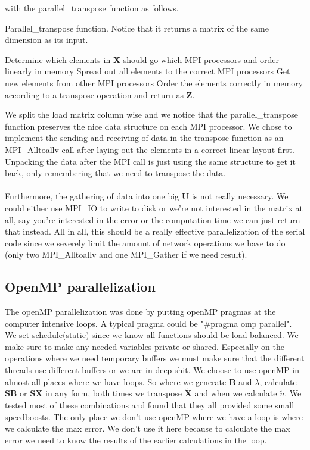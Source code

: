 \noindent with the parallel\_transpose function as follows.\\
\begin{algorithm}[H]
 \caption{Parallel\_transpose function. Notice that it returns a matrix of the same dimension as its input.}
 Determine which elements in $\mathbf{X}$ should go which MPI processors and order linearly in memory \;
 Spread out all elements to the correct MPI processors \;
 Get new elements from other MPI processors \;
 Order the elements correctly in memory according to a transpose operation and return as $\mathbf{Z}$.
 \label{code:transpose}
\end{algorithm}
\noindent We split the load matrix column wise and we notice that the parallel\_transpose function preserves the nice data structure on each MPI processor. We chose to implement the sending and receiving of data in the transpose function as an MPI\_Alltoallv call after laying out the elements in a correct linear layout first. Unpacking the data after the MPI call is just using the same structure to get it back, only remembering that we need to transpose the data.
\\ \\
Furthermore, the gathering of data into one big $\mathbf{U}$ is not really necessary. We could either use MPI\_IO to write to disk or we're not interested in the matrix at all, say you're interested in the error or the computation time we can just return that instead. All in all, this should be a really effective parallelization of the serial code since we severely limit the amount of network operations we have to do (only two MPI\_Alltoallv and one MPI\_Gather if we need result).
\subsection*{OpenMP parallelization}
The openMP parallelization was done by putting openMP pragmas at the computer intensive loops. A typical pragma could be "\#pragma omp parallel". We set schedule(static) since we know all functions should be load balanced. We make sure to make any needed variables private or shared. Especially on the operations where we need temporary buffers we must make sure that the different threads use different buffers or we are in deep shit. We choose to use openMP in almost all places where we have loops. So where we generate $\mathbf{B}$ and $\lambda$, calculate $\mathbf{SB}$ or $\mathbf{SX}$ in any form, both times we transpose $\mathbf{\widetilde{X}}$ and when we calculate $\widetilde{u}$. We tested most of these combinations and found that they all provided some small speedboosts. The only place we don't use openMP where we have a loop is where we calculate the max error. We don't use it here because  to calculate the max error we need to know the results of the earlier calculations in the loop.